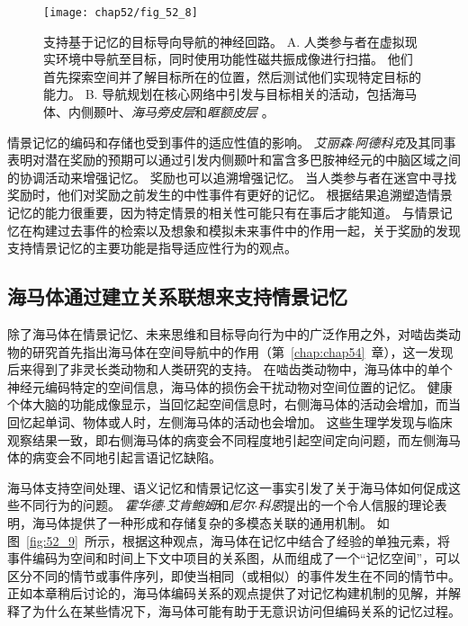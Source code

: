 \begin{figure}[htbp]
	\centering
	\texttt{[image: chap52/fig\_52\_8]}
	\caption{支持基于记忆的目标导向导航的神经回路\cite{brown2016prospective}。
		A. 人类参与者在虚拟现实环境中导航至目标，同时使用功能性磁共振成像进行扫描。
		他们首先探索空间并了解目标所在的位置，然后测试他们实现特定目标的能力。
		B. 导航规划在核心网络中引发与目标相关的活动，包括海马体、内侧颞叶、\textit{海马旁皮层}和\textit{眶额皮层 }。}
	\label{fig:52_8}
\end{figure}


情景记忆的编码和存储也受到事件的适应性值的影响。
\textit{艾丽森$\cdot$阿德科克}及其同事表明对潜在奖励的预期可以通过引发内侧颞叶和富含多巴胺神经元的中脑区域之间的协调活动来增强记忆。
奖励也可以追溯增强记忆。
当人类参与者在迷宫中寻找奖励时，他们对奖励之前发生的中性事件有更好的记忆。
根据结果​​追溯塑造情景记忆的能力很重要，因为特定情景的相关性可能只有在事后才能知道。
与情景记忆在构建过去事件的检索以及想象和模拟未来事件中的作用一起，关于奖励的发现支持情景记忆的主要功能是指导适应性行为的观点。



\subsection{海马体通过建立关系联想来支持情景记忆}

除了海马体在情景记忆、未来思维和目标导向行为中的广泛作用之外，对啮齿类动物的研究首先指出海马体在空间导航中的作用（第~\ref{chap:chap54}~章），这一发现后来得到了非灵长类动物和人类研究的支持。
在啮齿类动物中，海马体中的单个神经元编码特定的空间信息，海马体的损伤会干扰动物对空间位置的记忆。
健康个体大脑的功能成像显示，当回忆起空间信息时，右侧海马体的活动会增加，而当回忆起单词、物体或人时，左侧海马体的活动也会增加。
这些生理学发现与临床观察结果一致，即右侧海马体的病变会不同程度地引起空间定向问题，而左侧海马体的病变会不同地引起言语记忆缺陷。


海马体支持空间处理、语义记忆和情景记忆这一事实引发了关于海马体如何促成这些不同行为的问题。
\textit{霍华德$\cdot$艾肯鲍姆}和\textit{尼尔$\cdot$科恩}提出的一个令人信服的理论表明，海马体提供了一种形成和存储复杂的多模态关联的通用机制。
如图~\ref{fig:52_9}~所示，根据这种观点，海马体在记忆中结合了经验的单独元素，将事件编码为空间和时间上下文中项目的关系图，从而组成了一个“记忆空间”，可以区分不同的情节或事件序列，即使当相同（或相似）的事件发生在不同的情节中。
正如本章稍后讨论的，海马体编码关系的观点提供了对记忆构建机制的见解，并解释了为什么在某些情况下，海马体可能有助于无意识访问但编码关系的记忆过程。


